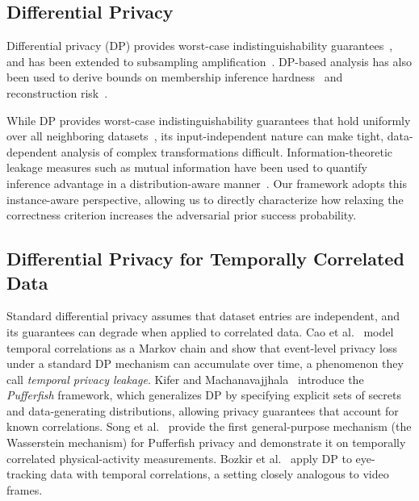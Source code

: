 \documentclass[letterpaper]{article} %
\begin{document}
\subsection{Differential Privacy}

Differential privacy (DP) provides worst-case indistinguishability guarantees~\cite{dwork2008differential,duchi2013local,bun2016cdp}, and has been extended to subsampling amplification~\cite{balle2018subsampling}. DP-based analysis has also been used to derive bounds on membership inference hardness~\cite{thudi2022bounding} and reconstruction risk~\cite{balle2022reconstructing}.

While DP provides worst-case indistinguishability guarantees that hold uniformly over all neighboring datasets~\cite{dwork2008differential,duchi2013local,bun2016cdp}, its input-independent nature can make tight, data-dependent analysis of complex transformations difficult. Information-theoretic leakage measures such as mutual information have been used to quantify inference advantage in a distribution-aware manner~\cite{russo2016controlling,raginsky2016information,xiao2023pacprivacy}. Our framework adopts this instance-aware perspective, allowing us to directly characterize how relaxing the correctness criterion increases the adversarial prior success probability.


\subsection{Differential Privacy for Temporally Correlated Data}

Standard differential privacy assumes that dataset entries are independent, and its guarantees can degrade when applied to correlated data. Cao et al.~\cite{cao2017quantifying} model temporal correlations as a Markov chain and show that event-level privacy loss under a standard DP mechanism can accumulate over time, a phenomenon they call \emph{temporal privacy leakage}. Kifer and Machanavajjhala~\cite{kifer2014pufferfish} introduce the \emph{Pufferfish} framework, which generalizes DP by specifying explicit sets of secrets and data-generating distributions, allowing privacy guarantees that account for known correlations. Song et al.~\cite{song2017pufferfish} provide the first general-purpose mechanism (the Wasserstein mechanism) for Pufferfish privacy and demonstrate it on temporally correlated physical-activity measurements. Bozkir et al.~\cite{bozkir2021differential} apply DP to eye-tracking data with temporal correlations, a setting closely analogous to video frames.
\end{document}
